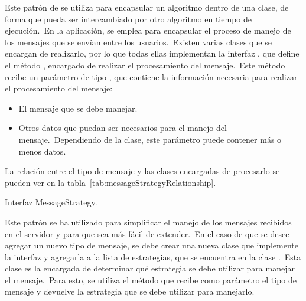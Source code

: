 
Este patrón de  se utiliza para encapsular un algoritmo dentro de una clase, de forma que
pueda ser intercambiado por otro algoritmo en tiempo de ejecución.\ En la aplicación, se emplea para encapsular el
proceso de manejo de los mensajes que se envían entre los usuarios.\ Existen varias clases que se encargan de
realizarlo, por lo que todas ellas implementan la interfaz , que define el método
, encargado de realizar el procesamiento del mensaje.\ Este método recibe un
parámetro de tipo , que contiene la información necesaria para realizar el procesamiento
del mensaje:

\begin{itemize}
	\item El mensaje que se debe manejar.
	\item Otros datos que puedan ser necesarios para el manejo del mensaje.\ Dependiendo de la clase, este parámetro
	puede contener más o menos datos.
\end{itemize}
\label{itm:parametershandlestrategy}

La relación entre el tipo de mensaje y las clases encargadas de procesarlo se pueden ver en la
tabla~\ref{tab:messageStrategyRelationship}.

\begin{umlDiagram}
	\centering

	\caption{Interfaz MessageStrategy.}
\end{umlDiagram}

Este patrón se ha utilizado para simplificar el manejo de los mensajes recibidos en el servidor y para que sea más
fácil de extender.\ En el caso de que se desee agregar un nuevo tipo de mensaje, se debe crear una nueva clase que
implemente la interfaz  y agregarla a la lista de estrategias, que se encuentra en la
clase .\ Esta clase es la encargada de determinar qué estrategia se debe utilizar para
manejar el mensaje.\ Para esto, se utiliza el método  que
recibe como parámetro el tipo de mensaje y devuelve la estrategia que se debe utilizar para manejarlo.

